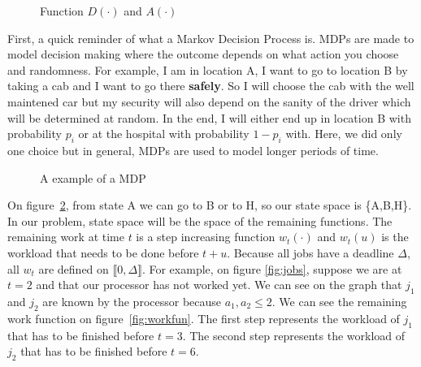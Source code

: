 \documentclass[
10pt, %
a4paper, %
oneside, %
headinclude,footinclude, %
BCOR5mm, %
]{scrartcl}
\begin{document}
\begin{figure}
  \centering
  \caption{Function $D(\cdot)$ and $A(\cdot)$}
  \label{fig:D}
\end{figure}

First, a quick reminder of what a Markov Decision Process is. MDPs are
made to model decision making where the outcome depends on what action
you choose and randomness. For example, I am in location A, I want to
go to location B by taking a cab and I want to go there
\textbf{safely}. So I will choose the cab with the well maintened car
but my security will also depend on the sanity of the driver which
will be determined at random. In the end, I will either end up in
location B with probability $p_i$ or at the hospital with probability
$1-p_i$ with. Here, we did only one choice but in general, MDPs are
used to model longer periods of time.\\

\begin{figure}
  \centering
 \caption{A example of a MDP}
  \label{fig:mdp}
\end{figure}

On figure~\ref{fig:mdp}, from state A we can go to B or to H, so our state
space is \{A,B,H\}. In our problem, state space will be the space of
the remaining functions. 
The remaining work at time $t$ is a step increasing function
$w_t(\cdot)$ and $w_t(u)$ is the workload that needs to be done before
$t+u$. Because all jobs have a deadline $\Delta$, all $w_t$ are
defined on $\llbracket 0,\Delta\rrbracket$. For example, on figure
\ref{fig:jobs}, suppose we are at $t=2$ and that our processor has not
worked yet. We can see on the graph that $j_1$ and $j_2$ are known by
the processor because $a_1,a_2\leq 2$. We can see the remaining work
function on figure~\ref{fig:workfun}. The first step represents the
workload of $j_1$ that has to be finished before $t=3$. The second
step represents the workload of $j_2$ that has to be finished before
$t=6$. 
\end{document}

